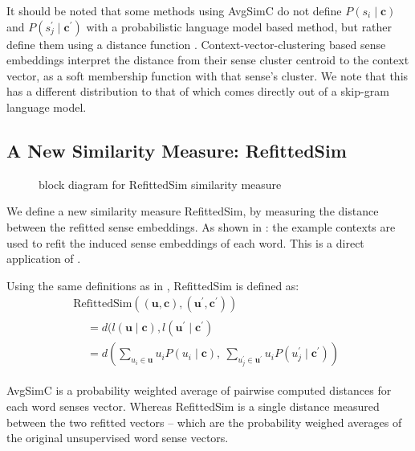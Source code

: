 \documentclass{sig-alternate}
\renewcommand{\c}{\mathbf{c}}
\renewcommand{\u}{\mathbf{u}}
\begin{document}
It should be noted that some methods using AvgSimC  do not define  $P(s_{i}\mid\c)$ and $P(s_{j}^{\prime}\mid\c^\prime)$ with a probabilistic language model based method, but rather define them using a distance function \parencite{Reisinger2010, Huang2012}. Context-vector-clustering based sense embeddings interpret the distance from their sense cluster centroid to the context vector, as a soft membership function with that sense's cluster. We note that this has a different distribution to that of which comes directly out of a skip-gram language model.



\subsection{A New Similarity Measure: RefittedSim}\label{RefittedSimVsAvgSimC}
\begin{figure}
	\begin{adjustbox}{max width=\columnwidth}
	
	\end{adjustbox}
	\caption{ block diagram for RefittedSim similarity measure} \label{diaRefittedSim}
\end{figure}
We define a new similarity measure RefittedSim, by measuring the distance between the refitted sense embeddings.
As shown in : the example contexts are used to refit the induced sense embeddings of each word.
This is a direct application of  . 

Using the same definitions as in , RefittedSim is defined as:
\begin{multline} \label{eq:refittedsim}
\mathrm{RefittedSim}((\u,\c),(\u^{\prime},\c^{\prime}))\\
\begin{aligned}
&= d(l(\u \mid \c), l(\u^\prime \mid \c^\prime)\\
&= d\left(
\sum_{u_{i}\in\u}u_{i}P(u_{i}\mid\c),\:
\sum_{u_{j}^{\prime}\in\u^{\prime}}u_{i}P(u_{j}^{\prime}\mid\c^{\prime})\right)
\end{aligned}
\end{multline}

AvgSimC is a probability weighted average of pairwise computed distances for each word senses vector.
Whereas RefittedSim is a single distance measured between the two refitted vectors -- which are the probability weighed averages of the original unsupervised word sense vectors.
\end{document}
